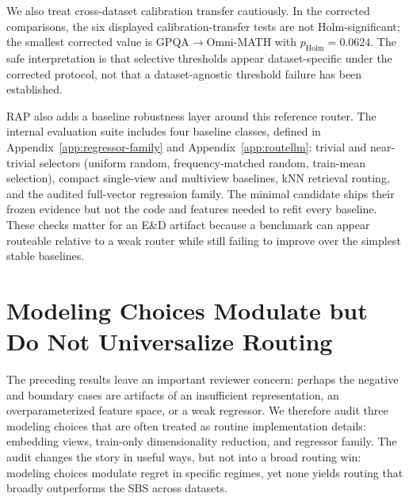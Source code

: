 \documentclass{article}
\begin{document}
We also treat cross-dataset calibration transfer cautiously. In the corrected comparisons, the six displayed calibration-transfer tests are not Holm-significant; the smallest corrected value is GPQA$\rightarrow$Omni-MATH with $p_{\text{Holm}}=0.0624$. The safe interpretation is that selective thresholds appear dataset-specific under the corrected protocol, not that a dataset-agnostic threshold failure has been established.

RAP also adds a baseline robustness layer around this reference router. The internal evaluation suite includes four baseline classes, defined in Appendix~\ref{app:regressor-family} and Appendix~\ref{app:routellm}: trivial and near-trivial selectors (uniform random, frequency-matched random, train-mean selection), compact single-view and multiview baselines, kNN retrieval routing, and the audited full-vector regression family. The minimal candidate ships their frozen evidence but not the code and features needed to refit every baseline. These checks matter for an E\&D artifact because a benchmark can appear routeable relative to a weak router while still failing to improve over the simplest stable baselines.


\section{Modeling Choices Modulate but Do Not Universalize Routing}
\label{sec:dim}

The preceding results leave an important reviewer concern: perhaps the negative and boundary cases are artifacts of an insufficient representation, an overparameterized feature space, or a weak regressor. We therefore audit three modeling choices that are often treated as routine implementation details: embedding views, train-only dimensionality reduction, and regressor family. The audit changes the story in useful ways, but not into a broad routing win: modeling choices modulate regret in specific regimes, yet none yields routing that broadly outperforms the SBS across datasets.
\end{document}

